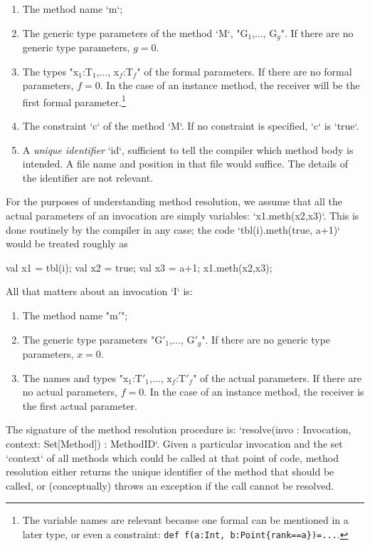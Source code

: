 \begin{enumerate}
\item The method name \xcd`m`;
\item The generic type parameters of the method \xcd`M`,  \xcdmath"G$_1$,$\ldots$, G$_g$".  If there
      are no generic type parameters, {$g=0$}.  
\item The types \xcdmath"x$_1$:T$_1$,$\ldots$, x$_f$:T$_f$" of the formal parameters.  If
      there are no formal parameters, {$f=0$}. In the case of an instance
      method, the receiver will be the first formal parameter.\footnote{The
      variable names are relevant because one formal can be mentioned in a
      later type, or even a constraint: {\tt def f(a:Int, b:Point\{rank==a\})=...}.}
\item The constraint \xcd`c` of the method \xcd`M`. If no constraint is specified, \xcd`c` is
      \xcd`true`. 
\item A {\em unique identifier} \xcd`id`, sufficient to tell the compiler
      which method body is intended.  A file name and position in that file
      would suffice.  The details of the identifier are not relevant.
\end{enumerate}

For the purposes of understanding method resolution, we assume that all the
actual parameters of an invocation are simply variables: \xcd`x1.meth(x2,x3)`.
This is done routinely by the compiler in any case; the code 
\xcd`tbl(i).meth(true, a+1)` would be treated roughly as 
\begin{xten}
val x1 = tbl(i);
val x2 = true;
val x3 = a+1;
x1.meth(x2,x3);
\end{xten}

All that matters about an invocation \xcd`I` is: 
\begin{enumerate}
\item The method name \xcdmath"m$'$";
\item The generic type parameters \xcdmath"G$'_1$,$\ldots$, G$'_g$".  If there
      are no generic type parameters, {$x=0$}.  
\item The names and types \xcdmath"x$_1$:T$'_1$,$\ldots$, x$_f$:T$'_f$" of the actual parameters.  If
      there are no actual parameters, {$f=0$}. In the case of an instance
      method, the receiver is the first actual parameter.
\end{enumerate}

The signature of the method resolution procedure is: 
\xcd`resolve(invo : Invocation, context: Set[Method]) : MethodID`.  
Given a particular invocation and the set \xcd`context` of all methods
which could be called at that point of code, method resolution either returns
the unique identifier of the method that should be called, or (conceptually)
throws an exception if the call cannot be resolved.

